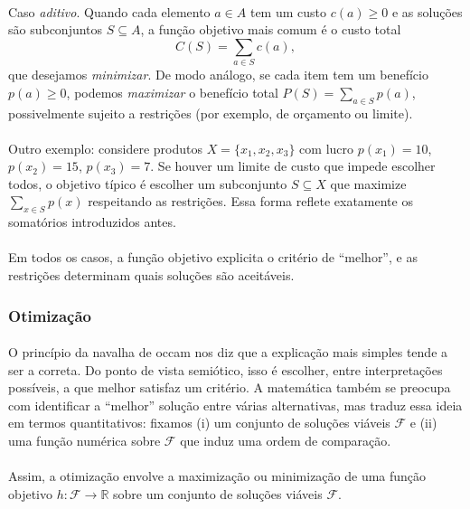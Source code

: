 \documentclass[12pt,a4paper]{article}
\begin{document}
\paragraph{}
Caso \emph{aditivo}. Quando cada elemento \(a\in A\) tem um custo \(c(a)\ge 0\) e as soluções são subconjuntos \(S\subseteq A\), a função objetivo mais comum é o custo total
\[C(S)=\sum_{a\in S} c(a),\]
que desejamos \emph{minimizar}. De modo análogo, se cada item tem um benefício \(p(a)\ge 0\), podemos \emph{maximizar} o benefício total \(P(S)=\sum_{a\in S} p(a)\), possivelmente sujeito a restrições (por exemplo, de orçamento ou limite).

\paragraph{}
Outro exemplo: considere produtos \(X=\{x_1,x_2,x_3\}\) com lucro \(p(x_1)=10\), \(p(x_2)=15\), \(p(x_3)=7\). Se houver um limite de custo que impede escolher todos, o objetivo típico é escolher um subconjunto \(S\subseteq X\) que maximize \(\sum_{x\in S} p(x)\) respeitando as restrições. Essa forma reflete exatamente os somatórios introduzidos antes.

\paragraph{}
Em todos os casos, a função objetivo explicita o critério de “melhor”, e as restrições determinam quais soluções são aceitáveis.

\subsubsection{Otimização}
\paragraph{}
O princípio da navalha de occam nos diz que a explicação mais simples tende a ser a correta. Do ponto de vista semiótico, isso é escolher, entre interpretações possíveis, a que melhor satisfaz um critério. A matemática também se preocupa com identificar a “melhor” solução entre várias alternativas, mas traduz essa ideia em termos quantitativos: fixamos (i) um conjunto de soluções viáveis \(\mathcal{F}\) e (ii) uma função numérica sobre \(\mathcal{F}\) que induz uma ordem de comparação. 

\paragraph{}
Assim, a otimização envolve a maximização ou minimização de uma função objetivo \(h: \mathcal{F} \to \mathbb{R}\) sobre um conjunto de soluções viáveis \(\mathcal{F}\).
\end{document}
